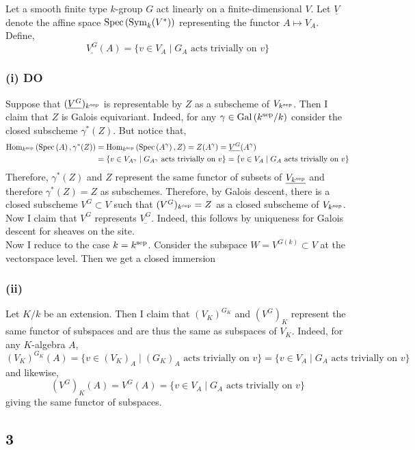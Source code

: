 \documentclass[12pt]{article}
\begin{document}
Let a smooth finite type $k$-group $G$ act linearly on a finite-dimensional $V$. Let $\underline{V}$ denote the affine space $\mathrm{Spec}\left( \mathrm{Sym}_{k}\! \left( V^* \right) \right)$ representing the functor $A \mapsto V_A$. Define,
\[ \underline{V^G}(A) = \{ v \in V_A \mid G_A \text{ acts trivially on } v \} \]

\subsubsection{(i) DO }

Suppose that $(\underline{V^G})_{k^{\mathrm{sep}}}$ is representable by $Z$ as a subscheme of $V_{k^{\mathrm{sep}}}$. Then I claim that $Z$ is Galois equivariant. Indeed,   for any $\gamma \in \mathrm{Gal}\left( k^{\mathrm{sep}}/k \right)$ consider the closed subscheme $\gamma^*(Z)$. But notice that,
\begin{align*}
\mathrm{Hom}_{k^{\mathrm{sep}}} \left( \mathrm{Spec}\left( A \right), \gamma^*(Z) \right) & = \mathrm{Hom}_{k^{\mathrm{sep}}} \left( \mathrm{Spec}\left( A^{\gamma} \right), Z \right) = Z(A^\gamma) = \underline{V^G}(A^\gamma)
\\
& = \{ v \in V_{A^\gamma} \mid G_{A^\gamma} \text{ acts trivially on }  v \} = \{ v \in V_{A} \mid G_A \text{ acts trivially on } v \} 
\end{align*}
Therefore, $\gamma^*(Z)$ and $Z$ represent the same functor of subsets of $\underline{V_{k^{\mathrm{sep}}}}$ and therefore $\gamma^*(Z) = Z$ as subschemes. Therefore, by Galois descent, there is a closed subscheme $V^G \subset V$ such that $(V^G)_{k^{\mathrm{sep}}} = Z$ as a closed subscheme of $V_{k^{\mathrm{sep}}}$. Now I claim that $V^G$ represents $\underline{V^G}$. Indeed, this follows by uniqueness for Galois descent for sheaves on the \etale site.
\bigskip\\
Now I reduce to the case $k = k^{\mathrm{sep}}$. Consider the subspace $W = V^{G(k)} \subset V$ at the vectorspace level. Then we get a closed immersion 

\subsubsection{(ii)}

Let $K/k$ be an extension. Then I claim that $(V_K)^{G_K}$ and $(V^G)_K$ represent the same functor of subspaces and are thus the same as subspaces of $V_K$. Indeed, for any $K$-algebra $A$,
\[ (V_K)^{G_K}(A) = \{ v \in (V_K)_A \mid (G_K)_A \text{ acts trivially on } v \} = \{ v \in V_A \mid G_A \text{ acts trivially on } v \} \]
and likewise,
\[ (V^G)_K(A) = V^G(A) = \{ v \in V_A \mid G_A \text{ acts trivially on } v \} \]
giving the same functor of subspaces.

\subsection{3}
\end{document}
